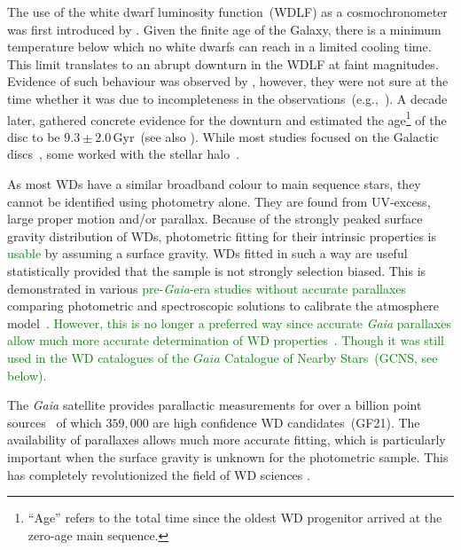 \documentclass[fleqn,usenatbib]{mnras}
\begin{document}
The use of the white dwarf luminosity function~(WDLF) as a cosmochronometer was
first introduced by \citet{1959ApJ...129..243S}. Given the finite age of the
Galaxy, there is a minimum temperature below which no white dwarfs can reach in
a limited cooling time. This limit translates to an abrupt downturn in the WDLF
at faint magnitudes. Evidence of such behaviour was observed by
\citet{1979ApJ...233..226L}, however, they were not sure at the time whether it
was due to incompleteness in the observations~(e.g.,~\citealp{1984ApJ...282..615I}). A decade later,
\citet{1987ApJ...315L..77W} gathered concrete evidence for the downturn and
estimated the age\footnote{``Age'' refers to the total time since the oldest
WD progenitor arrived at the zero-age main sequence.} of the disc to be
$9.3 \pm 2.0$\,Gyr~(see also \citealt{1988ApJ...332..891L}). While most studies
focused on the Galactic discs~\citep{1989LNP...328...15L, 1992ApJ...386..539W,
1995LNP...443...24O, 1998ApJ...497..294L, 1999MNRAS.306..736K,
2012ApJS..199...29G, 2021A&A...649A...6G}, some worked with the stellar
halo~\citep{2006AJ....131..571H, 2011MNRAS.417...93R, 2017AJ....153...10M,
2019MNRAS.482..715L, 2021MNRAS.502.1753T}.
 
As most WDs have a similar broadband colour to main sequence stars, they cannot be
identified using photometry alone. They are found from UV-excess, large
proper motion and/or parallax. Because of the strongly peaked surface gravity
distribution of WDs, photometric fitting for their intrinsic properties
is \textcolor{green}{usable} by assuming a surface gravity. WDs fitted in such a way are useful
statistically provided that the sample is not strongly selection biased. This
is demonstrated in various \textcolor{green}{pre-\textit{Gaia}-era studies without accurate parallaxes}
comparing photometric and spectroscopic solutions to calibrate the atmosphere
model~\citep{2019ApJ...871..169G, 2019ApJ...882..106G}. \textcolor{green}{However,
this is no longer a preferred way since accurate \textit{Gaia} parallaxes allow
much more accurate determination of WD properties~\citep[e.g.][hereafter, GF21]{2021MNRAS.508.3877G}. Though it was still used in the WD catalogues of the
$Gaia$ Catalogue of Nearby Stars~(GCNS, see below).}

The \textit{Gaia} satellite provides parallactic measurements for over a billion point
sources~\citep{2021A&A...649A...1G, 2021AJ....161..147B} of which $359,000$
are high confidence WD candidates~(GF21).
The availability of parallaxes allows much more accurate fitting, which is
particularly important when the surface gravity is unknown for the photometric
sample. This has completely revolutionized the field of WD sciences \textcolor{nick}{\citep{2024NewAR..9901705T}}. 
\end{document}
